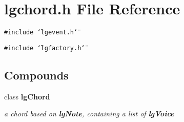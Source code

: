 \section{lgchord.h File Reference}
\label{lgchord_8h}
{\tt \#include \char`\"{}lgevent.h\char`\"{}}\par
{\tt \#include \char`\"{}lgfactory.h\char`\"{}}\par
\subsection*{Compounds}
\begin{CompactItemize}
\item 
class {\bf lg\-Chord}
\begin{CompactList}\small\item\em a chord based on {\bf lg\-Note}, containing a list of {\bf lg\-Voice} \item\end{CompactList}\end{CompactItemize}
